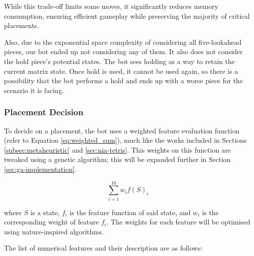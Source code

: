 \documentclass[a4paper, 12pt]{extreport}
\begin{document}
				While this trade-off limits some moves, it significantly reduces memory consumption, ensuring efficient gameplay while preserving the majority of critical placements.
				
				Also, due to the exponential space complexity of considering all five-lookahead pieces, our bot ended up not considering any of them. It also does not consider the hold piece's potential states. The bot sees holding as a way to retain the current matrix state. Once hold is used, it cannot be used again, so there is a possibility that the bot performs a hold and ends up with a worse piece for the scenario it is facing.
			
			\subsubsection{Placement Decision}
			
				To decide on a placement, the bot uses a weighted feature evaluation function (refer to Equation \ref{eq:weighted_sum}), much like the works included in Sections \ref{subsec:metaheuristic} and \ref{sec:nia-tetris}. This weights on this function are tweaked using a genetic algorithm; this will be expanded further in Section \ref{sec:ga-implementation}. 
				
				\begin{equation}\label{eq:weighted_sum}
					\sum_{i=1}^{10} w_i f(S)_i
				\end{equation}
				
				\noindent where $S$ is a state, $f_i$ is the feature function of said state, and $w_i$ is the corresponding weight of feature $f_i$. The weights for each feature will be optimised using nature-inspired algorithms.
				
				The list of numerical features and their description are as follows:
				
\end{document}
